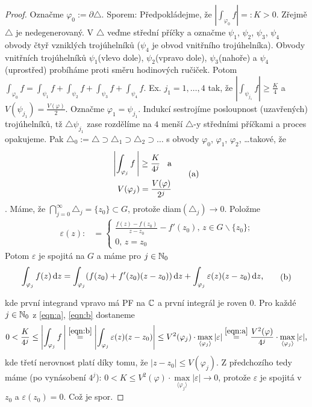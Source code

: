 \begin{proof}
Označme $\varphi_0:=\partial\triangle$. Sporem: Předpokládejme, že $|\int_{\varphi_0}f|=:K>0$. Zřejmě $\triangle$ je nedegenerovaný. V  $\triangle$ veďme střední příčky a označme $\psi_1$, $\psi_2$, $\psi_3$, $\psi_4$ obvody čtyř vzniklých trojúhelníků ($\psi_4$ je obvod vnitřního trojúhelníka). Obvody vnitřních trojúhelníků $\psi_1$(vlevo dole),  $\psi_2$(vpravo dole), $\psi_3$(nahoře) a  $\psi_4$(uprostřed) probíháme proti směru hodinových ručiček.
Potom $\int_{\varphi_0}f=\int_{\psi_1}f+\int_{\psi_2}f+\int_{\psi_3}f+\int_{\psi_4}f$. Ex. $j_1=1, \ldots, 4$ tak, že $|\int_{\psi_{j_1}}f|\ge \frac{K}{4}$ a $V({\psi_{j_1}})= \frac{V(\varphi)}{2}$.
Označme $\varphi_1=\psi_{j_1}$. Indukcí sestrojíme posloupnost (uzavřených) trojúhelníků, tž $\triangle \psi_{j_1}$ zase rozdělíme na $4$ menší $\triangle$-y středními příčkami a proces opakujeme. Pak 
$\triangle_0:=\triangle \supset \triangle_1 \supset \triangle_2 \supset \ldots$ s obvody $\varphi_0$, $\varphi_1$, $\varphi_2$, \ldots takové, že \begin{equation}
\begin{aligned}
        \left|\int_{\varphi_j}f\, \right|\ge \frac{K}{4^j} \text{\hspace{3mm}a}\\ V({\varphi_j})= \frac{V(\varphi)}{2^j}
\end{aligned}
\tag{a}
\label{eqn:a}
\end{equation}. Máme, že $\bigcap\limits_{j=0}^\infty \triangle_j=\{z_0\} \subset G$, %
protože diam$(\triangle_j)\rightarrow 0$. Položme
$$\begin{aligned}
\varepsilon(z): &=
\left\{
	\begin{array}{ll}
		\frac{f(z)-f(z_0)}{z-z_0}-f'(z_0) \text{, } z \in G \backslash \{z_0\} \text{;}\\
		0  \text{, } z=z_0
	\end{array}
\right.
\end{aligned}
$$
Potom $\varepsilon$ je spojitá na $G$ a máme pro $j \in \operatorname{\mathbb{N}}_0$
\begin{equation}
    \begin{aligned}
    \int_{\varphi_j}f(z) \mathop{}\!\mathrm{d} z = \int_{\varphi_j}(f(z_0)+f'(z_0)(z-z_0)) \mathop{}\!\mathrm{d} z + \int_{\varphi_j}\varepsilon(z)(z-z_0) \mathop{}\!\mathrm{d} z \text{,}
    \end{aligned}
    \tag{b}
    \label{eqn:b}
\end{equation}

kde první integrand vpravo má PF na $\operatorname{\mathbb{C}}  $ a první integrál je roven $0$. Pro každé $j \in \operatorname{\mathbb{N}}_0$ z  \cref{eqn:a}, \cref{eqn:b} dostaneme
$$
0<\frac{K}{4^j} \le \left| \int_{\varphi_j}f\,\right|\stackrel{\cref{eqn:b}}{=} \left|\int_{\varphi_j}\varepsilon(z)(z-z_0)\right| \le V^2(\varphi_j) \cdot \max_{\langle\varphi_j\rangle}|\varepsilon|\overset{\cref{eqn:a}}{=}\frac{V^2(\varphi)}{4^j}\cdot \max_{\langle\varphi_j\rangle}|\varepsilon| \text{,}
$$
kde třetí nerovnost platí díky tomu, že $|z-z_0| \le V(\varphi_j)$. Z předchozího tedy máme (po vynásobení $4^j$): $0<K \le V^2(\varphi) \cdot \max\limits_{\langle\varphi_j\rangle}|\varepsilon| \rightarrow 0$, protože $\varepsilon$ je spojitá v $z_0$ a $\varepsilon(z_0)=0$. Což je spor.
\end{proof}
